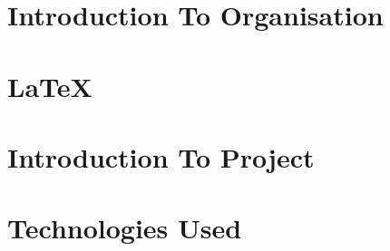 \documentclass[12pt]{report}
\begin{document}

\begin{screen}
\ppttitle
\end{screen}
\footskip 0.7cm
\thispagestyle{empty} 
\pagetitle
\newpage
{}
\cfoot{\thepage}


\newpage



\newpage
\tableofcontents
\newpage
\listoffigures
\newpage

\cfoot{\thepage}

\newpage
\chapter{Introduction To Organisation}

\newpage
\chapter{\LaTeX}

\chapter{Introduction To Project}



%
\chapter{Technologies Used}
%
%
%
%
%
\end{document}
